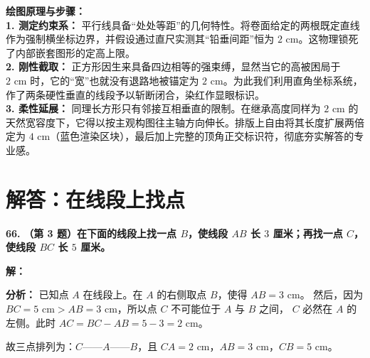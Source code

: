 \vspace{0.4cm}
{\small\color{blue!70!black}
\textbf{绘图原理与步骤：}\\
\textbf{1. 测定约束系：} 平行线具备“处处等距”的几何特性。将卷面给定的两根既定直线作为强制横坐标边界，并假设通过直尺实测其“铅垂间距”恒为 $2\text{ cm}$。这物理锁死了内部嵌套图形的定高上限。\\
\textbf{2. 刚性截取：} 正方形因生来具备四边相等的强束缚，显然当它的高被困局于 $2\text{ cm}$ 时，它的“宽”也就没有退路地被锚定为 $2\text{ cm}$。为此我们利用直角坐标系统，作了两条硬性垂直的线段予以斩断闭合，染红作显眼标识。\\
\textbf{3. 柔性延展：} 同理长方形只有邻接互相垂直的限制。在继承高度同样为 $2\text{ cm}$ 的天然宽容度下，它得以按主观构图往主轴方向伸长。排版上自由将其长度扩展两倍定为 $4\text{ cm}$（蓝色渲染区块），最后加上完整的顶角正交标识符，彻底夯实解答的专业感。
}

\newpage


\section{解答：在线段上找点}

\vspace{0.6cm}

\textbf{\LARGE 66.} \textbf{（第 3 题）在下面的线段上找一点 $B$，使线段 $AB$ 长 $3$ 厘米；再找一点 $C$，使线段 $BC$ 长 $5$ 厘米。}

\vspace{0.4cm}
\textbf{解：}

\vspace{0.2cm}
\textbf{分析：} 已知点 $A$ 在线段上。在 $A$ 的右侧取点 $B$，使得 $AB = 3\text{ cm}$。
然后，因为 $BC = 5\text{ cm} > AB = 3\text{ cm}$，所以点 $C$ 不可能位于 $A$ 与 $B$ 之间，
$C$ 必然在 $A$ 的左侧。此时 $AC = BC - AB = 5 - 3 = 2\text{ cm}$。

故三点排列为：$C$——$A$——$B$，且 $CA = 2\text{ cm}$，$AB = 3\text{ cm}$，$CB = 5\text{ cm}$。

\vspace{0.4cm}

\begin{center}
\end{center}

